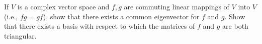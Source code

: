 If $V$ is a complex vector space and $f, g$ are commuting linear mappings of $V$ into $V$ (i.e., $fg = gf$), show that there exists a common eigenvector for $f$ and $g$. Show that there exists a basis with respect to which the matrices of $f$ and $g$ are both triangular.
